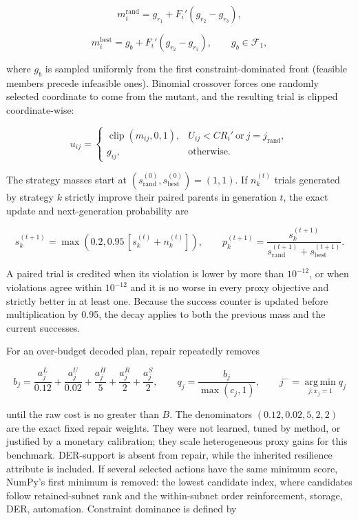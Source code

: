 \documentclass[energies,article,submit,moreauthors]{Definitions/mdpi}
\begin{document}
\[
m_i^{\mathrm{rand}}=g_{r_1}+F_i'(g_{r_2}-g_{r_3}),
\]

\[
m_i^{\mathrm{best}}=g_b+F_i'(g_{r_2}-g_{r_3}),\qquad g_b\in\mathcal F_1,
\]

where \(g_b\) is sampled uniformly from the first constraint-dominated front (feasible members precede infeasible ones). Binomial crossover forces one randomly selected coordinate to come from the mutant, and the resulting trial is clipped coordinate-wise:

\[
u_{ij}=\begin{cases}\operatorname{clip}(m_{ij},0,1),&
U_{ij}<CR_i'\ \text{or}\ j=j_{\mathrm{rand}},\\
g_{ij},&\text{otherwise}.
\end{cases}
\]

The strategy masses start at \((s_{\mathrm{rand}}^{(0)},s_{\mathrm{best}}^{(0)})=(1,1)\). If \(n_k^{(t)}\) trials generated by strategy \(k\) strictly improve their paired parents in generation \(t\), the exact update and next-generation probability are

\[
s_k^{(t+1)}=\max\!\left(0.2,0.95\,[s_k^{(t)}+n_k^{(t)}]\right),
\qquad
p_k^{(t+1)}=\frac{s_k^{(t+1)}}{s_{\mathrm{rand}}^{(t+1)}+s_{\mathrm{best}}^{(t+1)}}.
\]

A paired trial is credited when its violation is lower by more than \(10^{-12}\), or when violations agree within \(10^{-12}\) and it is no worse in every proxy objective and strictly better in at least one. Because the success counter is updated before multiplication by 0.95, the decay applies to both the previous mass and the current successes.

For an over-budget decoded plan, repair repeatedly removes

\[
b_j=\frac{a_j^L}{0.12}+\frac{a_j^U}{0.02}+\frac{a_j^H}{5}
+\frac{a_j^R}{2}+\frac{a_j^S}{2},\qquad
q_j=\frac{b_j}{\max(c_j,1)},\qquad
j^-=\operatorname*{arg\,min}_{j:x_j=1}q_j
\]

until the raw cost is no greater than \(B\). The denominators \((0.12,0.02,5,2,2)\) are the exact fixed repair weights. They were not learned, tuned by method, or justified by a monetary calibration; they scale heterogeneous proxy gains for this benchmark. DER-support is absent from repair, while the inherited resilience attribute is included. If several selected actions have the same minimum score, NumPy's first minimum is removed: the lowest candidate index, where candidates follow retained-subnet rank and the within-subnet order reinforcement, storage, DER, automation. Constraint dominance is defined by
\end{document}
